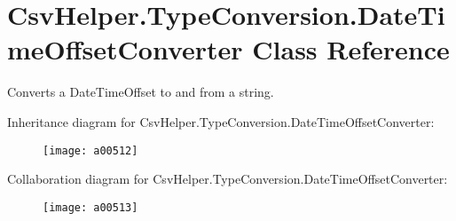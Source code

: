 \hypertarget{a00079}{\section{Csv\-Helper.\-Type\-Conversion.\-Date\-Time\-Offset\-Converter Class Reference}
\label{a00079}
}


Converts a Date\-Time\-Offset to and from a string.  




Inheritance diagram for Csv\-Helper.\-Type\-Conversion.\-Date\-Time\-Offset\-Converter\-:
\nopagebreak
\begin{figure}[H]
\begin{center}
\leavevmode
\texttt{[image: a00512]}
\end{center}
\end{figure}


Collaboration diagram for Csv\-Helper.\-Type\-Conversion.\-Date\-Time\-Offset\-Converter\-:
\nopagebreak
\begin{figure}[H]
\begin{center}
\leavevmode
\texttt{[image: a00513]}
\end{center}
\end{figure}
